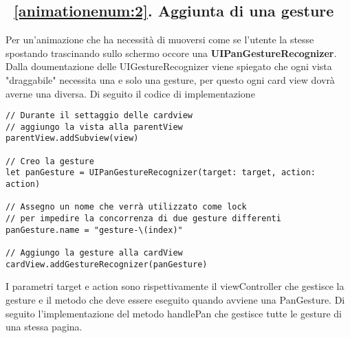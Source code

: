 \subsection{~\ref{animationenum:2}. Aggiunta di una gesture}\label{gestureimplemention}

Per un'animazione che ha necessità di muoversi come se l'utente la stesse spostando trascinando sullo schermo occore una \textbf{UIPanGestureRecognizer}.
Dalla doumentazione delle UIGestureRecognizer viene spiegato che ogni vista "draggabile" necessita una  e solo una gesture,
per questo ogni card view dovrà averne una diversa. Di seguito il codice di implementazione

\begin{verbatim}
// Durante il settaggio delle cardview
// aggiungo la vista alla parentView
parentView.addSubview(view)

// Creo la gesture
let panGesture = UIPanGestureRecognizer(target: target, action: action)

// Assegno un nome che verrà utilizzato come lock
// per impedire la concorrenza di due gesture differenti
panGesture.name = "gesture-\(index)"

// Aggiungo la gesture alla cardView
cardView.addGestureRecognizer(panGesture)
\end{verbatim}

I parametri target e action sono rispettivamente il viewController che gestisce la gesture e il metodo
che deve essere eseguito quando avviene una PanGesture.
Di seguito l'implementazione del metodo handlePan che gestisce tutte le gesture di una stessa pagina.

